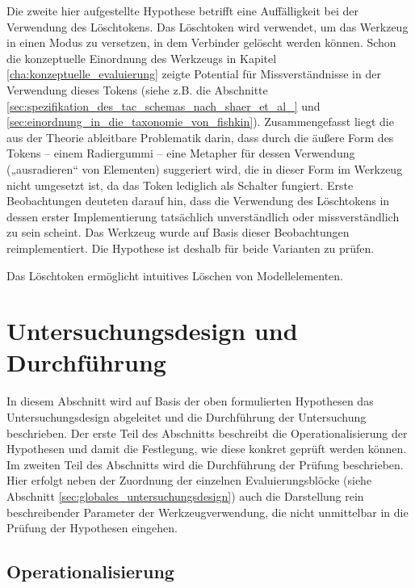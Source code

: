 Die zweite hier aufgestellte Hypothese betrifft eine Auffälligkeit bei der Verwendung des Löschtokens. Das Löschtoken wird verwendet, um das Werkzeug in einen Modus zu versetzen, in dem Verbinder gelöscht werden können. Schon die konzeptuelle Einordnung des Werkzeugs in Kapitel \ref{cha:konzeptuelle_evaluierung} zeigte Potential für Missverständnisse in der Verwendung dieses Tokens (siehe z.B. die Abschnitte \ref{sec:spezifikation_des_tac_schemas_nach_shaer_et_al_} und \ref{sec:einordnung_in_die_taxonomie_von_fishkin}). Zusammengefasst liegt die aus der Theorie ableitbare Problematik darin, dass durch die äußere Form des Tokens -- einem Radiergummi -- eine Metapher für dessen Verwendung („ausradieren“ von Elementen) suggeriert wird, die in dieser Form im Werkzeug nicht umgesetzt ist, da das Token lediglich als Schalter fungiert. Erste Beobachtungen deuteten darauf hin, dass die Verwendung des Löschtokens in dessen erster Implementierung tatsächlich unverständlich oder missverständlich zu sein scheint. Das Werkzeug wurde auf Basis dieser Beobachtungen reimplementiert. Die Hypothese ist deshalb für beide Varianten zu prüfen.

\begin{hyp}
	\label{hyp:radierer}
	Das Löschtoken ermöglicht intuitives Löschen von Modellelementen.
\end{hyp}


\section{Untersuchungsdesign und Durchführung} %
\label{sec:untersuchungsdesign}

In diesem Abschnitt wird auf Basis der oben formulierten Hypothesen das Untersuchungsdesign abgeleitet und die Durchführung der Untersuchung beschrieben. Der erste Teil des Abschnitts beschreibt die Operationalisierung der Hypothesen und damit die Festlegung, wie diese konkret geprüft werden können. Im zweiten Teil des Abschnitts wird die Durchführung der Prüfung beschrieben. Hier erfolgt neben der Zuordnung der einzelnen Evaluierungsblöcke (siehe Abschnitt \ref{sec:globales_untersuchungsdesign}) auch die Darstellung rein beschreibender Parameter der Werkzeugverwendung, die nicht unmittelbar in die Prüfung der Hypothesen eingehen. 

\subsection{Operationalisierung} %
\label{sub:operationalisierung}

